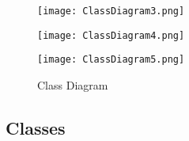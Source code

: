 \documentclass[12pt]{article}
\begin{document}
\begin{figure}[H]
\texttt{[image: ClassDiagram3.png]}
\end{figure}

\begin{figure}[H]
\texttt{[image: ClassDiagram4.png]}
\end{figure}

\begin{figure}[H]
\texttt{[image: ClassDiagram5.png]}
\caption{Class Diagram}
\label{fig:class-diagram}
\end{figure}

\clearpage

\subsection{Classes}\label{classes}
\end{document}
